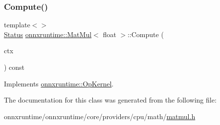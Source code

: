 \subsubsection{\texorpdfstring{Compute()}{Compute()}\hspace{0.1cm}{\footnotesize\ttfamily [2/2]}}
{\footnotesize\ttfamily template$<$$>$ \\
\mbox{\hyperlink{classonnxruntime_1_1common_1_1Status}{Status}} \mbox{\hyperlink{classonnxruntime_1_1MatMul}{onnxruntime\+::\+Mat\+Mul}}$<$ float $>$\+::Compute (\begin{DoxyParamCaption}\item[{\mbox{\hyperlink{classonnxruntime_1_1OpKernelContext}{Op\+Kernel\+Context}} $\ast$}]{ctx }\end{DoxyParamCaption}) const\hspace{0.3cm}{\ttfamily [virtual]}}



Implements \mbox{\hyperlink{classonnxruntime_1_1OpKernel_a9eca8656a78b1b3ab9d3351a12798650}{onnxruntime\+::\+Op\+Kernel}}.



The documentation for this class was generated from the following file\+:\begin{DoxyCompactItemize}
\item 
onnxruntime/onnxruntime/core/providers/cpu/math/\mbox{\hyperlink{cpu_2math_2matmul_8h}{matmul.\+h}}\end{DoxyCompactItemize}
